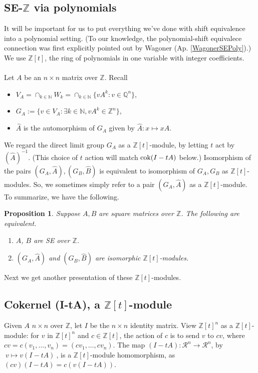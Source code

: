 \documentclass{amsart}
\newtheorem{prop}[equation]{Proposition}
\theoremstyle{definition}
\theoremstyle{definition}
\newcommand{\apr}{(Ap. \ref}
\newcommand{\Z}{\mathbb Z}
\newcommand{\Q}{\mathbb Q}
\newcommand{\N}{\mathbb N}
\newcommand{\cok}{\textnormal{cok}}
\numberwithin{equation}{subsection}
\begin{document}
\subsection{SE-$\Z$ via polynomials}

   It will be  important for us to put everything we've done
with shift equivalence   into a polynomial setting.
   (To our knowledge, the polynomial-shift equivalece
   connection was first explicitly pointed out
by Wagoner  \apr{WagonerSEPoly}).)
We use  $\Z[t]$, the ring of polynomials in one variable
   with integer coefficients.
   \\ \\
   Let $A$ be an $n\times n$ matrix over $\Z$. Recall
\begin{itemize}
\item    $V_A = \cap_{k\in \N}W_k = \cap_{k\in \N}\{ vA^k: v \in \Q^n\}$,
\item
   $G_A := \{ v\in V_A: \exists k\in \N , vA^k \in \Z^n\}$,
\item
   $\hat A$ is the  automorphism of $G_A$ given by
   $\hat A: x\mapsto xA$.
   \end{itemize}
We regard the direct limit group $G_A$  as a $\Z [t] $-module,
by letting $t$ act by $(\hat A)^{-1}$. (This
choice of $t$ action will match $\cok (I-tA)$ below.)
Isomorphism of the pairs $(G_A,\hat A), (G_B, \hat B)$ is
equivalent to isomorphism of
$G_A, G_B$ as $\Z [t]$-modules.
So, we sometimes simply refer to a
pair $(G_A, \hat A)$ as a $\Z[t]$-module.
To summarize, we have the following.
\begin{prop}
Suppose $A,B$ are square matrices over $\Z$. The
following are equivalent.
\begin{enumerate}
\item  $A$, $B$ are SE over $\Z$.
\item  $(G_A,\hat A)$ and $ (G_B,\hat B)$ are isomorphic $\Z [t]$-modules.
\end{enumerate}
\end{prop}
   Next we get another presentation of these $\Z[t]$-modules.


\subsection{Cokernel (I-tA), a $\Z [t]$-module}

   Given $A$ $n\times n$  over $\Z$,
   let $I$ be the $n\times n$ identity matrix.
   View $\Z [t]^n $ as a  $\Z [t]$-module: for $v$
   in $\Z [t]^n $ and $c\in \Z [t]$,
   the action  of $c$ is to send $v$ to $cv$, where
   $cv= c(v_1, \dots , v_n)=(cv_1, \dots , cv_n)$.
      The map
   $(I-tA): \mathcal R^n \to \mathcal R^n$, by
   $\ v\mapsto v(I-tA)\ $,
 is a $\Z [t]$-module homomorphism,
   as $(cv)(I-tA) = c(v(I-tA))$.
\end{document}
